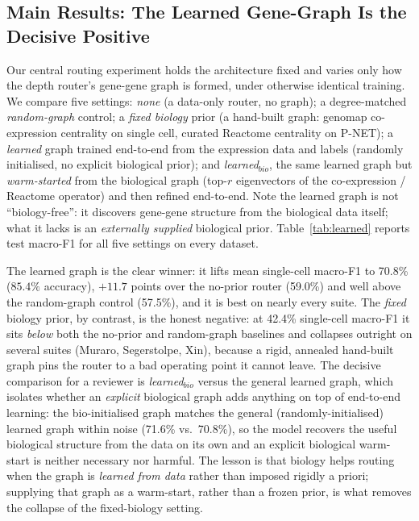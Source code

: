 \documentclass[letterpaper]{article}
\begin{document}
\subsection{Main Results: The Learned Gene-Graph Is the Decisive Positive}
\label{sec:interaction}
Our central routing experiment holds the architecture fixed and varies only how the
depth router's gene-gene graph is formed, under otherwise identical training. We compare
five settings: \emph{none} (a data-only router, no graph); a degree-matched
\emph{random-graph} control; a \emph{fixed biology} prior (a hand-built graph: genomap
co-expression centrality on single cell, curated Reactome centrality on P-NET); a
\emph{learned} graph trained end-to-end from the expression data and labels
(randomly initialised, no explicit biological prior); and \emph{learned$_{bio}$}, the
same learned graph but \emph{warm-started} from the biological graph (top-$r$
eigenvectors of the co-expression / Reactome operator) and then refined end-to-end. Note
the learned graph is not ``biology-free'': it discovers gene-gene structure from the
biological data itself; what it lacks is an \emph{externally supplied} biological prior.
Table~\ref{tab:learned} reports test macro-F1 for all five settings on every dataset.

The learned graph is the clear winner: it lifts mean single-cell macro-F1 to
70.8\% ($85.4\%$ accuracy), $+11.7$ points over
the no-prior router (59.0\%) and well above the random-graph control
(57.5\%), and it is best on nearly every suite. The \emph{fixed} biology
prior, by contrast, is the honest negative: at 42.4\% single-cell macro-F1 it
sits \emph{below} both the no-prior and random-graph baselines and collapses outright on
several suites (Muraro, Segerstolpe, Xin), because a rigid, annealed hand-built graph
pins the router to a bad operating point it cannot leave. The decisive comparison for a
reviewer is \emph{learned$_{bio}$} versus the general learned graph, which isolates
whether an \emph{explicit} biological graph adds anything on top of end-to-end learning:
the bio-initialised graph matches the general (randomly-initialised) learned graph within noise (71.6\% vs.\ 70.8\%), so the model recovers the useful biological structure from the data on its own and an explicit biological warm-start is neither necessary nor harmful. The lesson is that biology helps
routing when the graph is \emph{learned from data} rather than imposed rigidly a priori;
supplying that graph as a warm-start, rather than a frozen prior, is what removes the
collapse of the fixed-biology setting.
\end{document}
